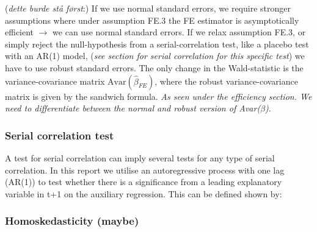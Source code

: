 (\textit{dette burde stå først}:) If we use normal standard errors, we require stronger assumptions where under assumption FE.3 the FE estimator is asymptotically efficient $\rightarrow$ we can use normal standard errors. If we relax assumption FE.3, or simply reject the null-hypothesis from a serial-correlation test, like a placebo test with an AR(1) model, (\textit{see section for serial correlation for this specific test}) we have to use robust standard errors. The only change in the Wald-statistic is the variance-covariance matrix $\text{Avar}(\hat{\beta}_{FE})$, where the robust variance-covariance matrix is given by the sandwich formula. \newline
\textit{As seen under the efficiency section. We need to differentiate between the normal and robust version of Avar($\beta$)}.


\subsubsection*{Serial correlation test}
A test for serial correlation can imply several tests for any type of serial correlation. In this report we utilise an autoregressive process with one lag (AR(1)) to test whether there is a significance from a leading explanatory variable in t+1 on the auxiliary regression. This can be defined shown by:

\subsubsection*{Homoskedasticity (maybe)}

